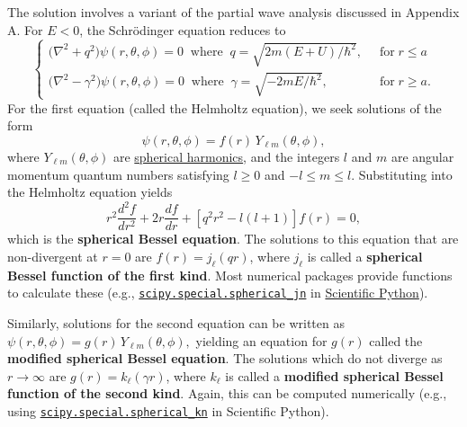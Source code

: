 \documentclass[prx,12pt]{revtex4-2}
\begin{document}
\begin{enumerate}
  The solution involves a variant of the partial wave analysis
  discussed in Appendix A.  For $E < 0$, the Schr\"odinger equation
  reduces to
  \begin{equation}
    \begin{cases}\Big(\nabla^2 + q^2\Big) \psi(r,\theta,\phi) = 0 \;\;\mathrm{where}\;\; q = \sqrt{2m(E+U)/\hbar^2}, \;\;&\mathrm{for} \; r \le a \\ \Big(\nabla^2 - \gamma^2\Big) \psi(r,\theta,\phi) = 0 \;\;\mathrm{where}\;\; \gamma = \sqrt{-2mE/\hbar^2}, \;\;&\mathrm{for} \; r \ge a. \end{cases}
  \end{equation}
  For the first equation (called the Helmholtz equation), we seek
  solutions of the form
  \begin{equation}
    \psi(r,\theta,\phi) = f(r) \, Y_{\ell m}(\theta,\phi),
  \end{equation}
  where $Y_{\ell m}(\theta,\phi)$ are
  \href{https://en.wikipedia.org/wiki/Spherical_harmonics}{spherical
    harmonics}, and the integers $l$ and $m$ are angular momentum
  quantum numbers satisfying $l \ge 0$ and $-l \le m \le l$.
  Substituting into the Helmholtz equation yields
  \begin{equation}
    r^2\frac{d^2f}{dr^2} + 2r \frac{df}{dr}+\left[q^2r^2-l(l+1)\right] f(r) = 0,
  \end{equation}
  which is the \textbf{spherical Bessel equation}.  The solutions to
  this equation that are non-divergent at $r = 0$ are $f(r) =
  j_\ell(qr)$, where $j_\ell$ is called a \textbf{spherical Bessel function
    of the first kind}.  Most numerical packages provide functions to
  calculate these (e.g.,
  \href{https://docs.scipy.org/doc/scipy/reference/generated/scipy.special.spherical_jn.html}{\texttt{scipy.special.spherical\_jn}}
  in \href{https://scipy.org/}{Scientific Python}).

  Similarly, solutions for the second equation can be written as
  $\psi(r,\theta,\phi) = g(r) \, Y_{\ell m}(\theta,\phi),$ yielding an
  equation for $g(r)$ called the \textbf{modified spherical Bessel
    equation}.  The solutions which do not diverge as $r\rightarrow
  \infty$ are $g(r) = k_\ell(\gamma r)$, where $k_\ell$ is called a
  \textbf{modified spherical Bessel function of the second kind}.
  Again, this can be computed numerically (e.g., using
  \href{https://docs.scipy.org/doc/scipy/reference/generated/scipy.special.spherical_kn.html#scipy.special.spherical_kn}{\texttt{scipy.special.spherical\_kn}}
  in Scientific Python).


\end{enumerate}
\end{document}
